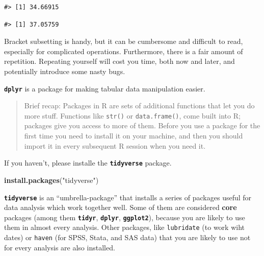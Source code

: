 \documentclass[]{book}
\newenvironment{Shaded}{\begin{snugshade}}{\end{snugshade}}
\newcommand{\DataTypeTok}[1]{\textcolor[rgb]{0.13,0.29,0.53}{#1}}
\newcommand{\KeywordTok}[1]{\textcolor[rgb]{0.13,0.29,0.53}{\textbf{#1}}}
\newcommand{\NormalTok}[1]{#1}
\newcommand{\OperatorTok}[1]{\textcolor[rgb]{0.81,0.36,0.00}{\textbf{#1}}}
\newcommand{\OtherTok}[1]{\textcolor[rgb]{0.56,0.35,0.01}{#1}}
\newcommand{\StringTok}[1]{\textcolor[rgb]{0.31,0.60,0.02}{#1}}
\begin{document}
\begin{verbatim}
#> [1] 34.66915
\end{verbatim}

\begin{Shaded}
\end{Shaded}

\begin{verbatim}
#> [1] 37.05759
\end{verbatim}

Bracket subsetting is handy, but it can be cumbersome and difficult to read, especially for complicated operations. Furthermore, there is a fair amount of repetition. Repeating yourself will cost you time, both now and later, and potentially introduce some nasty bugs.

\textbf{\texttt{dplyr}} is a package for making tabular data manipulation easier.

\begin{quote}
Brief recap:
Packages in R are sets of additional functions that let you do more stuff. Functions like \texttt{str()} or \texttt{data.frame()}, come built into R; packages give you access to more of them. Before you use a package for the first time you need to install it on your machine, and then you should import it in every subsequent R session when you need it.
\end{quote}

If you haven't, please installe the \textbf{\texttt{tidyverse}} package.

\begin{Shaded}
\begin{Highlighting}[]
\KeywordTok{install.packages}\NormalTok{(}\StringTok{"tidyverse"}\NormalTok{)    }
\end{Highlighting}
\end{Shaded}

\textbf{\texttt{tidyverse}} is an ``umbrella-package'' that installs a series of packages useful for data analysis which work together well. Some of them are considered \textbf{core} packages (among them \textbf{\texttt{tidyr}}, \textbf{\texttt{dplyr}}, \textbf{\texttt{ggplot2}}), because you are likely to use them in almost every analysis. Other packages, like \texttt{lubridate} (to work wiht dates) or \texttt{haven} (for SPSS, Stata, and SAS data) that you are likely to use not for every analysis are also installed.
\end{document}
